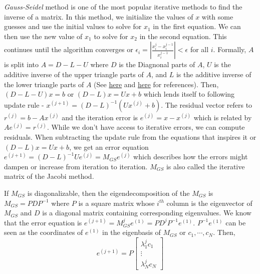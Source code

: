 \documentclass[12pt]{article}
\begin{document}
\textit{Gauss-Seidel} method is one of the most popular iterative methods to find the inverse of a matrix. In this method, we initialize the values of $x$ with some guesses and use the initial values to solve for $x_1$ in the first equation. We can then use the new value of $x_1$ to solve for $x_2$ in the second equation. This continues until the algorithm converges or $\epsilon_i = \left|\frac{x_i^j - x_i^{j - 1}}{x_i^{j - 1}}\right| < \epsilon$ for all $i$. Formally, $A$ is split into $A = D - L - U$ where $D$ is the Diagnonal parts of $A$, $U$ is the additive inverse of the upper triangle parts of $A$, and $L$ is the additive inverse of the lower triangle parts of $A$ (See \href{https://ocw.mit.edu/courses/16-920j-numerical-methods-for-partial-differential-equations-sma-5212-spring-2003/resources/lec6_notes/}{here} and \href{https://math.mit.edu/classes/18.086/2006/am62.pdf}{here} for references). Then, $(D - L - U)x = b$ or $(D - L)x = Ux + b$  which lends itself to following update rule - $x^{(j + 1)} = (D - L)^{-1}\left(Ux^{(j)} + b\right)$. The residual vector refers to $r^{(j)} = b - Ax^{(j)}$ and the iteration error is $e^{(j)} = x - x^{(j)}$ which is related by $Ae^{(j)} = r^{(j)}$. While we don't have access to iterative errors, we can compute residuals. When subtracting the update rule from the equations that inspires it or $(D - L)x = Ux + b$, we get an error equation $e^{(j + 1)} = (D - L)^{-1}Ue^{(j)} = M_{GS}e^{(j)}$ which describes how the errors might dampen or increase from iteration to iteration. $M_{GS}$ is also called the iterative matrix of the Jacobi method. 

If $M_{GS}$ is diagonalizable, then the eigendecomposition of the $M_{GS}$ is $M_{GS} = PDP^{-1}$ where $P$ is a square matrix whose $i^{th}$ column is the eigenvector of $M_{GS}$ and $D$ is a diagonal matrix containing corresponding eigenvalues. We know that the error equation is $e^{(j + 1)} = M_{GS}^je^{(1)} = PD^jP^{-1}e^{(1)}$. $P^{-1}e^{(1)}$ can be seen as the coordinates of $e^{(1)}$ in the eigenbasis of $M_{GS}$ or $c_1, \cdots, c_N$. Then, $$e^{(j + 1)}  = P\begin{bmatrix}
    \lambda_1^jc_1 \\
    \vdots \\
    \lambda_N^jc_N
\end{bmatrix}$$
\end{document}
